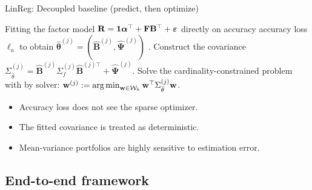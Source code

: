 \documentclass[10pt,aspectratio=169]{beamer}
\newcommand{\Kcard}{k}
\newcommand{\Wset}{\mathcal{W}}
\newcommand{\Bset}{\mathcal{B}}
\newcommand{\Loss}{\mathcal{L}}
\newcommand{\Param}{\theta}
\newcommand{\SigmaMat}{\Sigma}
\begin{document}
\begin{frame}{LinReg: Decoupled baseline (predict, then optimize)}
  \small 
  \begin{algorithm}[H]
    \DontPrintSemicolon
    Fitting the factor model $\mathbf{R} = \mathbf{1} \boldsymbol{\alpha}^\top + \mathbf{F}\mathbf{B}^\top + \boldsymbol{\varepsilon}$ directly on accuracy accuracy loss $\ell_a$ to obtain $\hat{\boldsymbol{\Param}}^{(j)}= (\hat{\mathbf{B}}^{(j)}, \hat{\boldsymbol{\Psi}}^{(j)})$    .\;
    Construct the covariance $\SigmaMat_{\hat{\Param}}^{(j)} = \hat{\mathbf{B}}^{(j)} \SigmaMat_f^{(j)} \hat{\mathbf{B}}^{(j)\top} + \hat{\boldsymbol{\Psi}}^{(j)}$.\;
    Solve the cardinality-constrained problem with by solver: $\mathbf{w}^{(j)}:=\argmin_{\mathbf{w}\in\Wset_\Kcard} \mathbf{w}^\top \SigmaMat_{\hat{\Param}}^{(j)} \mathbf{w}$.\;
  \end{algorithm}

  \begin{itemize}
    \item Accuracy loss does not see the sparse optimizer.
    \item The fitted covariance is treated as deterministic.
    \item Mean-variance portfolios are highly sensitive to estimation error.
  \end{itemize}
\end{frame}

\subsection{End-to-end framework}


\end{document}
